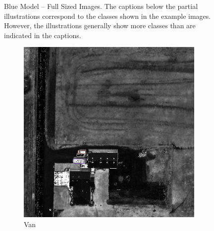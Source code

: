 \begin{figure}[h!]
    \caption[Blue Model – Full Sized Images]{Blue Model – Full Sized Images. The captions below the partial illustrations correspond to the classes shown in the example images. However, the illustrations generally show more classes than are indicated in the captions.}
    \label{fig:blue_ablation_examples_fs}
\end{figure}

\begin{figure}[h!]
    \centering
    \begin{subfigure}[t]{0.38\textwidth}
        \centering
        \includegraphics[width=\linewidth]{images/015Results/03ablation/comp_images/ndvi/198.png}
        \caption{Van}
    \end{subfigure}
    \begin{subfigure}[t]{0.38\textwidth}
        \centering

\end{subfigure}
\end{figure}
